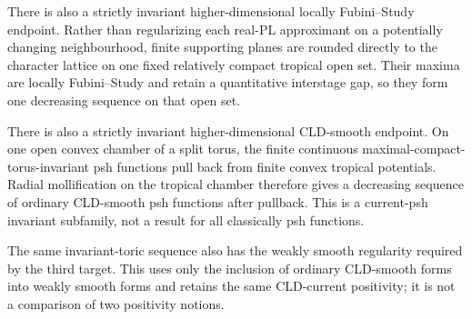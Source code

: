 There is also a strictly invariant higher-dimensional locally
Fubini--Study endpoint.  Rather than regularizing each real-PL approximant
on a potentially changing neighbourhood, finite supporting planes are
rounded directly to the character lattice on one fixed relatively compact
tropical open set.
Their maxima are locally Fubini--Study and retain a quantitative
interstage gap, so they form one decreasing sequence on that open set.



There is also a strictly invariant higher-dimensional CLD-smooth endpoint.
On one open convex chamber of a split torus, the finite continuous
maximal-compact-torus-invariant psh functions pull back from finite convex
tropical potentials.  Radial mollification on the tropical chamber therefore
gives a decreasing sequence of ordinary CLD-smooth psh functions after
pullback.  This is a current-psh invariant subfamily, not a result for all
classically psh functions.



The same invariant-toric sequence also has the weakly smooth regularity
required by the third target.  This uses only the inclusion of ordinary
CLD-smooth forms into weakly smooth forms and retains the same
CLD-current positivity; it is not a comparison of two positivity notions.



